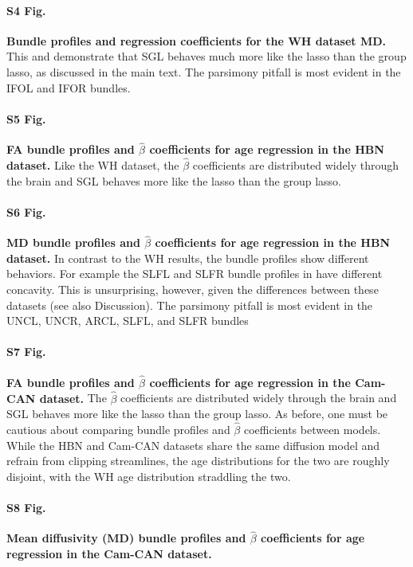\documentclass[10pt,letterpaper]{article}
\begin{document}
\paragraph*{S4 Fig.}
\label{S4_Fig}
{\bf Bundle profiles and regression coefficients for the WH dataset MD.}
This and  demonstrate that SGL behaves much more like the
lasso than the group lasso, as discussed in the main text. The parsimony pitfall
is most evident in the IFOL and IFOR bundles.

\paragraph*{S5 Fig.}
\label{S5_Fig}
{\bf FA bundle profiles and $\hat{\beta}$ coefficients for age regression in the HBN dataset.}
Like the WH dataset, the $\hat{\beta}$
coefficients are distributed widely through the brain and SGL behaves more like
the lasso than the group lasso.

\paragraph*{S6 Fig.}
\label{S6_Fig}
{\bf MD bundle profiles and $\hat{\beta}$ coefficients for age regression in the HBN dataset.}
In contrast to the WH results, the bundle
profiles show different behaviors. For example the SLFL and SLFR bundle profiles
in have different concavity. This is unsurprising, however, given the
differences between these datasets (see also Discussion). The parsimony pitfall
is most evident in the UNCL, UNCR, ARCL, SLFL, and SLFR bundles

\paragraph*{S7 Fig.}
\label{S7_Fig}
{\bf FA bundle profiles and $\hat{\beta}$ coefficients for age regression in the Cam-CAN dataset.}
The $\hat{\beta}$ coefficients are
distributed widely through the brain and SGL behaves more like the lasso than
the group lasso. As before, one must be cautious about comparing bundle profiles
and $\hat{\beta}$ coefficients between models. While the HBN and Cam-CAN
datasets share the same diffusion model and refrain from clipping streamlines,
the age distributions for the two are roughly disjoint, with the WH age
distribution straddling the two.

\paragraph*{S8 Fig.}
\label{S8_Fig}
{\bf Mean diffusivity (MD) bundle profiles and $\hat{\beta}$ coefficients for age regression in the Cam-CAN dataset.}
\end{document}
